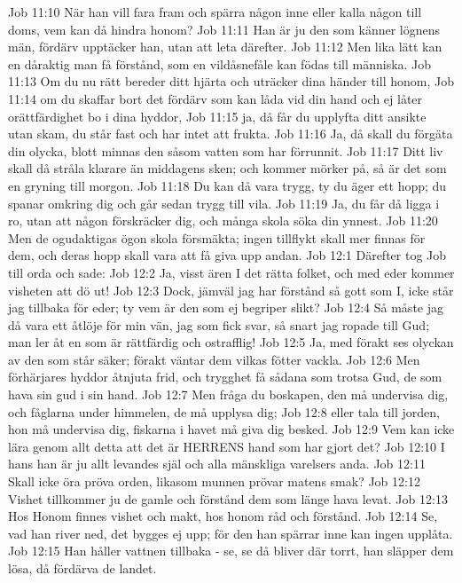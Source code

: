 Job 11:10  När han vill fara fram och spärra någon inne eller kalla någon till doms, vem kan då hindra honom?
Job 11:11  Han är ju den som känner lögnens män, fördärv upptäcker han, utan att leta därefter.
Job 11:12  Men lika lätt kan en dåraktig man få förstånd, som en vildåsnefåle kan födas till människa.
Job 11:13  Om du nu rätt bereder ditt hjärta och uträcker dina händer till honom,
Job 11:14  om du skaffar bort det fördärv som kan låda vid din hand och ej låter orättfärdighet bo i dina hyddor,
Job 11:15  ja, då får du upplyfta ditt ansikte utan skam, du står fast och har intet att frukta.
Job 11:16  Ja, då skall du förgäta din olycka, blott minnas den såsom vatten som har förrunnit.
Job 11:17  Ditt liv skall då stråla klarare än middagens sken; och kommer mörker på, så är det som en gryning till morgon.
Job 11:18  Du kan då vara trygg, ty du äger ett hopp; du spanar omkring dig och går sedan trygg till vila.
Job 11:19  Ja, du får då ligga i ro, utan att någon förskräcker dig, och många skola söka din ynnest.
Job 11:20  Men de ogudaktigas ögon skola försmäkta; ingen tillflykt skall mer finnas för dem, och deras hopp skall vara att få giva upp andan.
Job 12:1  Därefter tog Job till orda och sade:
Job 12:2  Ja, visst ären I det rätta folket, och med eder kommer visheten att dö ut!
Job 12:3  Dock, jämväl jag har förstånd så gott som I, icke står jag tillbaka för eder; ty vem är den som ej begriper slikt?
Job 12:4  Så måste jag då vara ett åtlöje för min vän, jag som fick svar, så snart jag ropade till Gud; man ler åt en som är rättfärdig och ostrafflig!
Job 12:5  Ja, med förakt ses olyckan av den som står säker; förakt väntar dem vilkas fötter vackla.
Job 12:6  Men förhärjares hyddor åtnjuta frid, och trygghet få sådana som trotsa Gud, de som hava sin gud i sin hand.
Job 12:7  Men fråga du boskapen, den må undervisa dig, och fåglarna under himmelen, de må upplysa dig;
Job 12:8  eller tala till jorden, hon må undervisa dig, fiskarna i havet må giva dig besked.
Job 12:9  Vem kan icke lära genom allt detta att det är HERRENS hand som har gjort det?
Job 12:10  I hans han är ju allt levandes själ och alla mänskliga varelsers anda.
Job 12:11  Skall icke öra pröva orden, likasom munnen prövar matens smak?
Job 12:12  Vishet tillkommer ju de gamle och förstånd dem som länge hava levat.
Job 12:13  Hos Honom finnes vishet och makt, hos honom råd och förstånd.
Job 12:14  Se, vad han river ned, det bygges ej upp; för den han spärrar inne kan ingen upplåta.
Job 12:15  Han håller vattnen tillbaka - se, se då bliver där torrt, han släpper dem lösa, då fördärva de landet.
